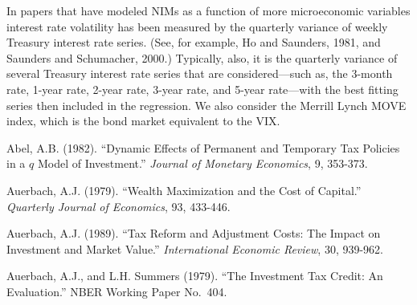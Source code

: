 \documentclass[11pt]{article}
\begin{document}
\begin{frame}
In papers that have modeled NIMs as a function of more microeconomic variables interest rate volatility has been measured by
the quarterly variance of weekly Treasury interest rate series. (See, for example, Ho and Saunders, 1981, and Saunders
and Schumacher, 2000.)  Typically, also, it is the quarterly variance of several Treasury interest rate series that are
considered---such as, the 3-month rate, 1-year rate, 2-year rate, 3-year rate, and 5-year rate---with the best fitting series then
included in the regression.  We also consider the Merrill Lynch MOVE index, which is the bond market equivalent to the VIX.



\newpage
\begin{thebibliography}{99}
\vspace{-0.1in}
 Abel, A.B. (1982).  ``Dynamic Effects of Permanent and Temporary Tax Policies in
a $q$ Model of Investment.''  \textit{Journal of Monetary Economics}, 9, 353-373.

 Auerbach, A.J. (1979). ``Wealth Maximization and the Cost of Capital.''
\textit{Quarterly Journal of Economics}, 93, 433-446.

 Auerbach, A.J. (1989). ``Tax Reform and Adjustment Costs:  The Impact on
Investment and Market Value.''  \textit{International Economic Review}, 30, 939-962.

 Auerbach, A.J., and L.H. Summers (1979). ``The Investment Tax Credit: An Evaluation.''
NBER Working Paper No.~404.

\end{thebibliography}



\end{frame}
\end{document}

